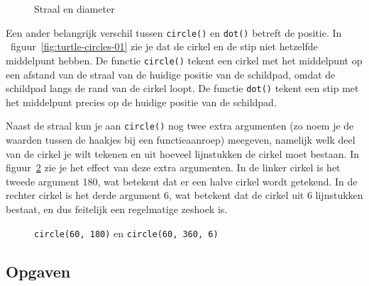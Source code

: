 \documentclass[../main]{subfiles}
\begin{document}
\begin{figure}[ht]
\centering
{}
\caption{Straal en diameter}%
\label{fig:straal-en-diameter}
\end{figure}

Een ander belangrijk verschil tussen \texttt{circle()} en \texttt{dot()} betreft de positie. In ~figuur~\ref{fig:turtle-circles-01} zie je dat de cirkel en de stip niet hetzelfde middelpunt hebben. De functie \texttt{circle()} tekent een cirkel met het middelpunt op een afstand van de straal van de huidige positie van de schildpad, omdat de schildpad langs de rand van de cirkel loopt. De functie \texttt{dot()} tekent een stip met het middelpunt precies op de huidige positie van de schildpad.

Naast de straal kun je aan \texttt{circle()} nog twee extra argumenten (zo noem je de waarden tussen de haakjes bij een functieaanroep) meegeven, namelijk welk deel van de cirkel je wilt tekenen en uit hoeveel lijnstukken de cirkel moet bestaan. In figuur~\ref{fig:turtle-extent-steps} zie je het effect van deze extra argumenten. In de linker cirkel is het tweede argument 180, wat betekent dat er een halve cirkel wordt getekend. In de rechter cirkel is het derde argument 6, wat betekent dat de cirkel uit 6 lijnstukken bestaat, en dus feitelijk een regelmatige zeshoek is.

\begin{figure}[ht]
    \centering
    \caption{\texttt{circle(60, 180)} en \texttt{circle(60, 360, 6)}}%
    \label{fig:turtle-extent-steps}
\end{figure}
\subsection*{Opgaven}
\end{document}
